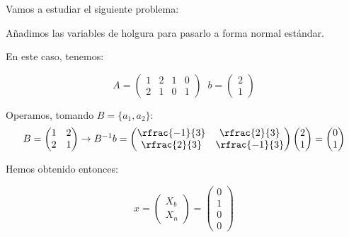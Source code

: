 \begin{example}
Vamos a estudiar el siguiente problema:

\begin{ioprob}
\end{ioprob}

\begin{figure}[h]
\centering
{}
\end{figure}

Añadimos las variables de holgura para pasarlo a forma normal estándar.

\begin{ioprob}
\end{ioprob}

En este caso, tenemos:

\[A = \begin{pmatrix}1&2&1&0\\2&1&0&1\end{pmatrix}\;\; b = \begin{pmatrix}2\\1\end{pmatrix}\]

Operamos, tomando $B = \{a_1,a_2\}$: \[B = \begin{pmatrix}1&2\\2&1\end{pmatrix} \to B^{-1}b = \begin{pmatrix}\rfrac{-1}{3}&\rfrac{2}{3}\\\rfrac{2}{3}&\rfrac{-1}{3}\end{pmatrix}\begin{pmatrix}2\\1\end{pmatrix} = \begin{pmatrix}0\\1\end{pmatrix}\]

Hemos obtenido entonces:

\[x = \begin{pmatrix}X_b\\\hline X_n\end{pmatrix} = \begin{pmatrix}0\\1\\\hline0\\0\end{pmatrix}\]


\end{example}
